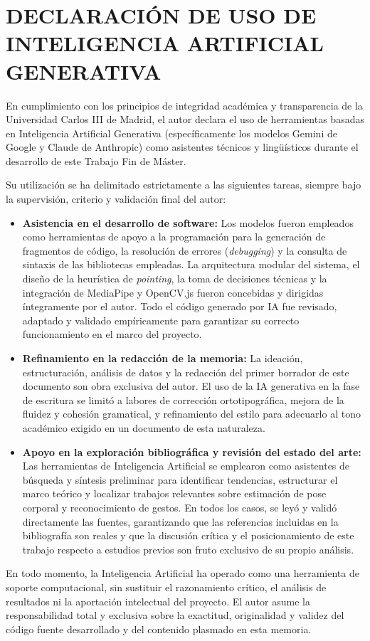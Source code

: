 \documentclass[12pt]{report} %
\begin{document}
\chapter{DECLARACIÓN DE USO DE INTELIGENCIA ARTIFICIAL GENERATIVA}

En cumplimiento con los principios de integridad académica y transparencia de la Universidad Carlos III de Madrid, el autor declara el uso de herramientas basadas en Inteligencia Artificial Generativa (específicamente los modelos Gemini de Google y Claude de Anthropic) como asistentes técnicos y lingüísticos durante el desarrollo de este Trabajo Fin de Máster. 

Su utilización se ha delimitado estrictamente a las siguientes tareas, siempre bajo la supervisión, criterio y validación final del autor:

\begin{itemize}
    \item \textbf{Asistencia en el desarrollo de software:} Los modelos fueron empleados como herramientas de apoyo a la programación para la generación de fragmentos de código, la resolución de errores (\textit{debugging}) y la consulta de sintaxis de las bibliotecas empleadas. La arquitectura modular del sistema, el diseño de la heurística de \textit{pointing}, la toma de decisiones técnicas y la integración de MediaPipe y OpenCV.js fueron concebidas y dirigidas íntegramente por el autor. Todo el código generado por IA fue revisado, adaptado y validado empíricamente para garantizar su correcto funcionamiento en el marco del proyecto.
    
    \item \textbf{Refinamiento en la redacción de la memoria:} La ideación, estructuración, análisis de datos y la redacción del primer borrador de este documento son obra exclusiva del autor. El uso de la IA generativa en la fase de escritura se limitó a labores de corrección ortotipográfica, mejora de la fluidez y cohesión gramatical, y refinamiento del estilo para adecuarlo al tono académico exigido en un documento de esta naturaleza.

    \item \textbf{Apoyo en la exploración bibliográfica y revisión del estado del arte:} Las herramientas de Inteligencia Artificial se emplearon como asistentes de búsqueda y síntesis preliminar para identificar tendencias, estructurar el marco teórico y localizar trabajos relevantes sobre estimación de pose corporal y reconocimiento de gestos. En todos los casos, se leyó y validó directamente las fuentes, garantizando que las referencias incluidas en la bibliografía son reales y que la discusión crítica y el posicionamiento de este trabajo respecto a estudios previos son fruto exclusivo de su propio análisis.
\end{itemize}

En todo momento, la Inteligencia Artificial ha operado como una herramienta de soporte computacional, sin sustituir el razonamiento crítico, el análisis de resultados ni la aportación intelectual del proyecto. El autor asume la responsabilidad total y exclusiva sobre la exactitud, originalidad y validez del código fuente desarrollado y del contenido plasmado en esta memoria.
\end{document}
